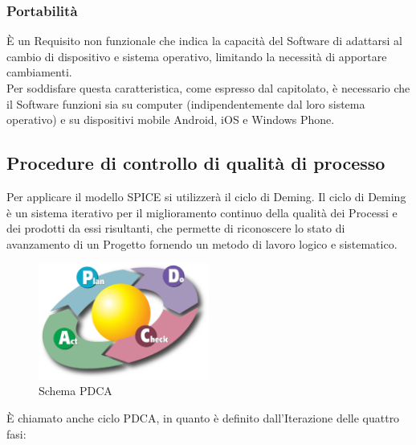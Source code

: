 \subsubsection{Portabilità}
È un Requisito non funzionale che indica la capacità del Software di adattarsi al cambio di dispositivo e sistema operativo, limitando la necessità di apportare cambiamenti.\\
Per soddisfare questa caratteristica, come espresso dal capitolato, è necessario che il Software funzioni sia su computer (indipendentemente dal loro sistema operativo) e su dispositivi mobile Android, iOS e Windows Phone.

\subsection{Procedure di controllo di qualità di processo}
Per applicare il modello SPICE si utilizzerà il ciclo di Deming. Il ciclo di Deming è un sistema iterativo per il miglioramento continuo della qualità dei Processi e dei prodotti da essi risultanti, che permette di riconoscere lo stato di avanzamento di un Progetto fornendo un metodo di lavoro logico e sistematico.

\begin{figure}[h]
  \centering
    \includegraphics[width=0.5\textwidth]{./images/deming}
  \caption{Schema PDCA}
  \label{fig:deming}
\end{figure}

È chiamato anche ciclo PDCA, in quanto è definito dall'Iterazione delle quattro fasi:
 
